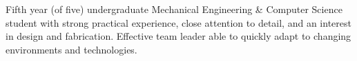 
\begin{center}
	\begin{minipage}[t]{0.90\textwidth}
		Fifth year (of five) undergraduate Mechanical Engineering \& Computer Science student with strong practical experience, close attention to detail, and an interest in design and fabrication. Effective team leader able to quickly adapt to changing environments and technologies.
	\end{minipage}
\end{center}